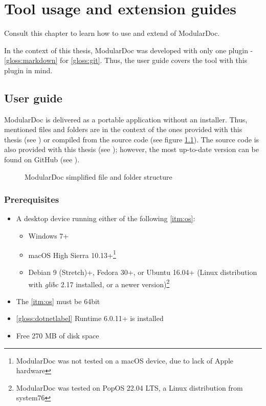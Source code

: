 \chapter{Tool usage and extension guides}

Consult this chapter to learn how to use and extend of ModularDoc.

In the context of this thesis, ModularDoc was developed with only one plugin - \ref{gloss:markdown} for \ref{gloss:git}.
Thus, the user guide covers the tool with this plugin in mind.


\section{User guide} \label{sec:userGuide}

ModularDoc is delivered as a portable application without an installer. Thus, mentioned files and folders are in the context of the ones provided with this thesis (see ) or compiled from the source code (see figure \ref{fig:applicationFileStructure}). The source code is also provided with this thesis (see ); however, the most up-to-date version can be found on GitHub (see ).

\begin{figure}[H]
    \caption{ModularDoc simplified file and folder structure}
    \label{fig:applicationFileStructure}
\end{figure}

\subsection{Prerequisites}

\begin{itemize}
    \item A desktop device running either of the following \ref{itm:os}:
    \begin{itemize}
        \item Windows 7+
        \item macOS High Sierra 10.13+\footnote{ModularDoc was not tested on a macOS device, due to lack of Apple hardware}
        \item  Debian 9 (Stretch)+, Fedora 30+, or Ubuntu 16.04+ (Linux distribution with \textit{glibc} 2.17 installed, or a newer version)\footnote{ModularDoc was tested on PopOS 22.04 LTS, a Linux distribution from system76}
    \end{itemize}
    \item The \ref{itm:os} must be 64bit
    \item \ref{gloss:dotnetlabel} Runtime 6.0.11+ is installed
    \item Free 270 MB of disk space
\end{itemize}

